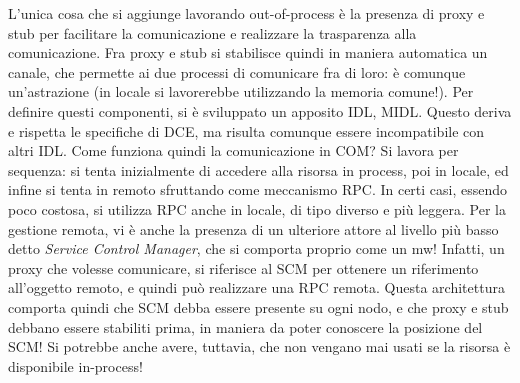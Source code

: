 L'unica cosa che si aggiunge lavorando out-of-process è la presenza di proxy e stub per facilitare la comunicazione e 
realizzare la trasparenza alla comunicazione. Fra proxy e stub si stabilisce quindi in maniera automatica un canale,
che permette ai due processi di comunicare fra di loro: è comunque un'astrazione (in locale si lavorerebbe utilizzando 
la memoria comune!). Per definire questi componenti, si è sviluppato un apposito IDL, MIDL. Questo deriva e rispetta
le specifiche di DCE, ma risulta comunque essere incompatibile con altri IDL.
Come funziona quindi la comunicazione in COM? Si lavora per sequenza: si tenta inizialmente di accedere alla risorsa in 
process, poi in locale, ed infine si tenta in remoto sfruttando come meccanismo RPC. In certi casi, essendo poco 
costosa, si utilizza RPC anche in locale, di tipo diverso e più leggera.
Per la gestione remota, vi è anche la presenza di un ulteriore attore al livello più basso detto \textit{Service 
Control Manager}, che si comporta proprio come un mw!
Infatti, un proxy che volesse comunicare, si riferisce al SCM per ottenere un riferimento all'oggetto remoto, e quindi 
può realizzare una RPC remota. Questa architettura comporta quindi che SCM debba essere presente su ogni nodo, e
che proxy e stub debbano essere stabiliti prima, in maniera da poter conoscere la posizione del SCM! Si potrebbe anche 
avere, tuttavia, che non vengano mai usati se la risorsa è disponibile in-process!
